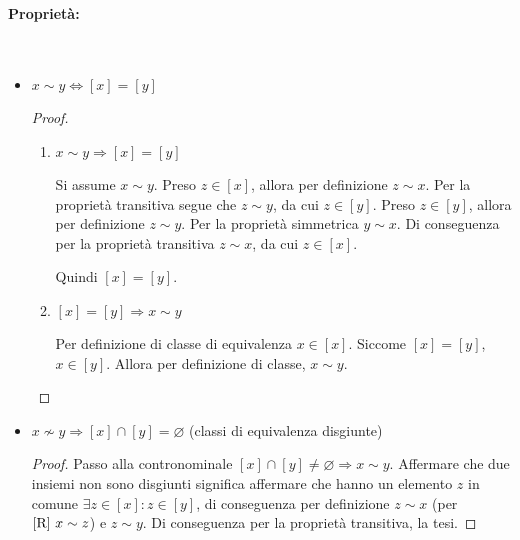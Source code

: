 \documentclass{article}     %
\begin{document}
\paragraph{Proprietà:}~
\begin{itemize}
    \item $x\sim y \Leftrightarrow [x]=[y]$
        \begin{proof}~
            \begin{enumerate}
                \item $x\sim y \Rightarrow [x]=[y]$
            
                Si assume $x\sim y$. 
                Preso $z\in [x]$, allora per definizione $z\sim x$. Per la proprietà transitiva segue che $z\sim y$, da cui $z\in [y]$.
                Preso $z\in [y]$, allora per definizione $z\sim y$. Per la proprietà simmetrica $y\sim x$. Di conseguenza per la proprietà transitiva $z\sim x$, da cui $z\in [x]$.
                
                Quindi $[x]=[y]$.
                \item $[x]=[y] \Rightarrow x\sim y$ 
            
                Per definizione di classe di equivalenza $x \in [x]$. Siccome $[x]=[y]$, $x\in [y]$. Allora per definizione di classe, $x\sim y$.
            \end{enumerate}
        \end{proof}
    \item $x\nsim y \Rightarrow [x]\cap[y]=\varnothing$ (classi di equivalenza disgiunte)
    \begin{proof}
        Passo alla contronominale $[x]\cap [y]\neq\varnothing\Rightarrow x\sim y$. Affermare che due insiemi non sono disgiunti significa affermare che hanno un elemento $z$ in comune $\exists z \in [x]: z\in [y]$, di conseguenza per definizione $z\sim x$  (per $[\textnormal{R}] ~x\sim z$)  e $z\sim y$.  Di conseguenza per la proprietà transitiva, la tesi.
    \end{proof}
\end{itemize}
\end{document}
